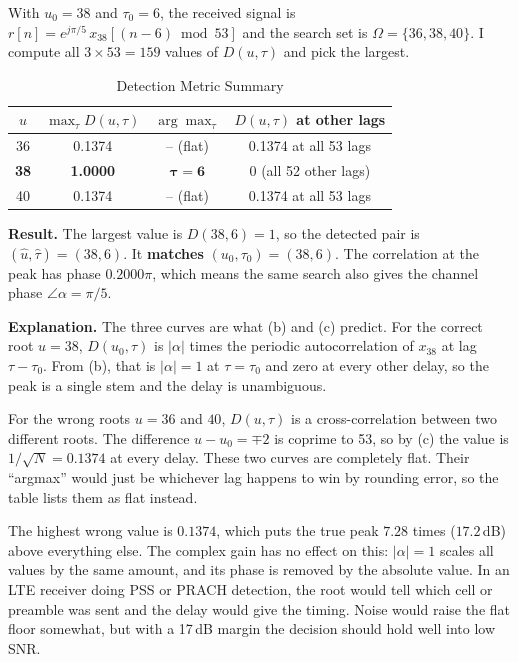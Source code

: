 \documentclass[12pt,a4paper]{report}
\begin{document}
With $u_0 = 38$ and $\tau_0 = 6$, the received signal is $r[n] = e^{j\pi/5}\,x_{38}[(n - 6) \bmod 53]$ and the search set
is $\Omega = \{36, 38, 40\}$. I compute all $3 \times 53 = 159$ values of $D(u, \tau)$ and pick the largest.

\begin{table}[H]
\centering
\caption{Detection Metric Summary}
\setlength{\tabcolsep}{12pt}
\renewcommand{\arraystretch}{1.2}
\begin{tabular}{cccc}
\toprule
$u$ & $\max_\tau D(u, \tau)$ & $\arg\max_\tau$ & $D(u, \tau)$ at other lags \\
\midrule
36 & 0.1374 & -- (flat) & 0.1374 at all 53 lags \\
\textbf{38} & \textbf{1.0000} & $\boldsymbol{\tau = 6}$ & 0 (all 52 other lags) \\
40 & 0.1374 & -- (flat) & 0.1374 at all 53 lags \\
\bottomrule
\end{tabular}
\end{table}

\textbf{Result.} The largest value is $D(38, 6) = 1$, so the detected pair is $(\hat{u}, \hat{\tau}) = (38, 6)$.
It \textbf{matches} $(u_0, \tau_0) = (38, 6)$. The correlation at the peak has phase $0.2000\pi$, which means the same
search also gives the channel phase $\angle\alpha = \pi/5$.

\textbf{Explanation.} The three curves are what (b) and (c) predict. For the correct root $u = 38$, $D(u_0, \tau)$ is
$|\alpha|$ times the periodic autocorrelation of $x_{38}$ at lag $\tau - \tau_0$. From (b), that is $|\alpha| = 1$ at
$\tau = \tau_0$ and zero at every other delay, so the peak is a single stem and the delay is unambiguous.

For the wrong roots $u = 36$ and $40$, $D(u, \tau)$ is a cross-correlation between two different roots. The difference
$u - u_0 = \mp 2$ is coprime to 53, so by (c) the value is $1/\sqrt{N} = 0.1374$ at every delay. These two curves are
completely flat. Their ``argmax'' would just be whichever lag happens to win by rounding error, so the table lists them
as flat instead.

The highest wrong value is $0.1374$, which puts the true peak $7.28$ times ($17.2$\,dB) above everything else. The
complex gain has no effect on this: $|\alpha| = 1$ scales all values by the same amount, and its phase is removed by the
absolute value. In an LTE receiver doing PSS or PRACH detection, the root would tell which cell or preamble was sent and
the delay would give the timing. Noise would raise the flat floor somewhat, but with a 17\,dB margin the decision
should hold well into low SNR.
\end{document}
